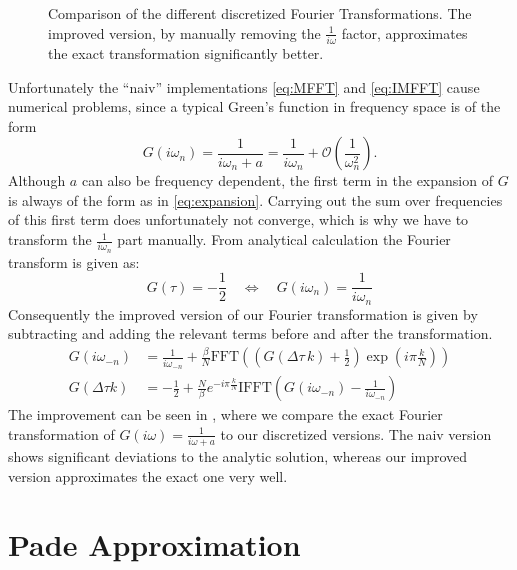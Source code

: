 \begin{appendix}
\begin{figure}[h]
	\caption{Comparison of the different discretized Fourier Transformations. The improved version, by manually removing the $\frac{1}{i \omega}$ factor, approximates the exact transformation significantly better. }
	\label{fig:fourier_traf}
\end{figure}
Unfortunately the ``naiv'' implementations \eqref{eq:MFFT} and \eqref{eq:IMFFT} cause numerical problems, since a typical Green's function in frequency space is of the form
\begin{equation}
	G(iω_n) = \frac{1}{iω_n +a} = \frac{1}{i ω_n} + \mathcal{O}\left(\frac{1}{ω_n^2}\right).
	\label{eq:expansion}
\end{equation}
Although $a$ can also be frequency dependent, the first term in the expansion of $G$ is always of the form as in \eqref{eq:expansion}. Carrying out the sum over frequencies of this first term does unfortunately not converge, which is why we have to transform the $\frac{1}{i ω_n}$ part manually. %
From analytical calculation the Fourier transform is given as:
\begin{equation}
	G(τ)=-\frac{1}{2} \quad ⇔ \quad G(i ω_n) =\frac{1}{i ω_n}
	\label{eq:ff_pair}
\end{equation}
Consequently the improved version of our Fourier transformation is given by subtracting and adding the relevant terms before and after the transformation.
\begin{align}
	G(i ω_{-n})&= \frac{1}{i ω_{-n}}+\frac{\beta}{N} \mathrm{FFT}\left( \left(G(\Delta τ \, k)+\frac{1}{2}\right)\exp{\left(i π \frac{k}{N}\right)}\right)\\
	G(\Delta τ k)&= -\frac{1}{2}+\frac{N}{β} e^{-i π \frac{k}{N}}\mathrm{IFFT}\left(G(iω_{-n})-\frac{1}{i ω_{-n}}\right)
	\label{eq:improved_fft}
\end{align}
The improvement can be seen in , where we compare the exact Fourier transformation of $G(i ω)=\frac{1}{iω+a}$ to our discretized versions. The naiv version shows significant deviations to the analytic solution, whereas our improved version approximates the exact one very well.  

\section{Pade Approximation}

\end{appendix}
